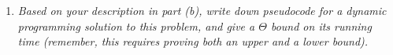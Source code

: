 \documentclass[12pt]{article}
\begin{document}
\begin{enumerate}
\begin{enumerate}
    	\item\textit{  Based on your description in part (b), write down pseudocode for a dynamic programming solution to this problem, and give a $\Theta$ bound on its running time (remember, this requires proving both an upper \emph{and} a lower bound).}
    \end{enumerate}

\end{enumerate}
\end{document}
